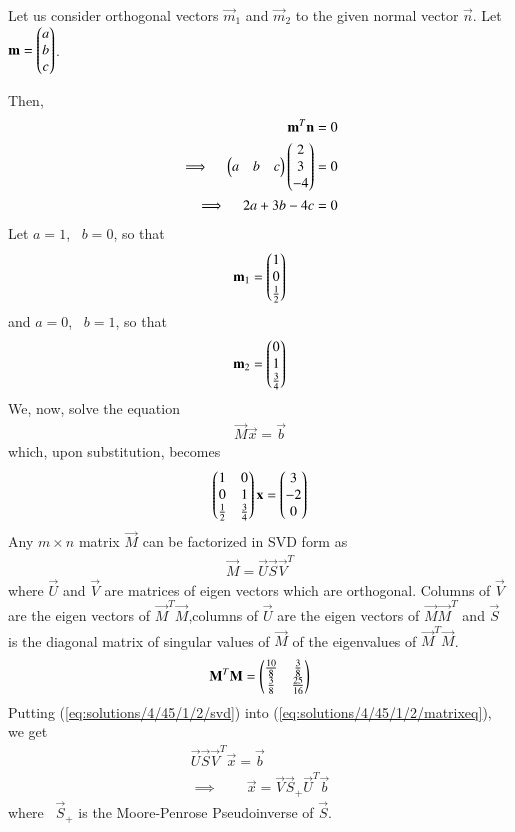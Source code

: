 Let us consider orthogonal vectors $\vec{m}_1$ and $\vec{m}_2$ to the given
normal vector $\vec{n}$. Let $\mathbf{m} = \begin{pmatrix}a\\ b\\ c\end{pmatrix}$.

Then, 
\begin{align}
	\mathbf{m}^T\mathbf{n} = 0 \\
	\implies \quad \begin{pmatrix}a & b & c\end{pmatrix}\begin{pmatrix}2\\ 3\\-4\end{pmatrix} = 0   \label{eq:solutions/4/45/1/2/mTn} \\
	\implies \quad 2a + 3b -4c = 0 
\end{align}
Let $a=1$, \ $b=0$, so that
\begin{align}
	\mathbf{m}_1 = \begin{pmatrix}1 \\ 0 \\ \frac{1}{2}\end{pmatrix} 
\end{align}
and $a=0$, \ $b=1$, so that
\begin{align}
	\mathbf{m}_2 = \begin{pmatrix}0 \\ 1 \\ \frac{3}{4}\end{pmatrix} 
\end{align}
We, now, solve the equation
\begin{align}
	\vec{M}\vec{x} = \vec{b} 	\label{eq:solutions/4/45/1/2/matrixeq}
\end{align}
which, upon substitution, becomes
\begin{align}
\begin{pmatrix}1 & 0\\ 0 & 1 \\ \frac{1}{2} & \frac{3}{4}\end{pmatrix}\mathbf{x}=\begin{pmatrix}3 \\ -2 \\ 0\end{pmatrix} 
\end{align}
	Any $m\times n$ matrix $\vec{M}$ can be factorized in SVD form as
\begin{align}
	\vec{M} = \vec{U}\vec{S}\vec{V}^T	\label{eq:solutions/4/45/1/2/svd}
\end{align}
where $\vec{U}$ and $\vec{V}$ are matrices of eigen vectors which are orthogonal. Columns of $\vec{V}$ are the eigen vectors of $\vec{M}^T\vec{M}$,columns of $\vec{U}$ are the eigen vectors of $\vec{M}\vec{M}^T$ and $\vec{S}$ is the diagonal matrix of singular values of $\vec{M}$ of the eigenvalues of $\vec{M}^T\vec{M}$.
\begin{align}
	\mathbf{M}^T\mathbf{M} = 
	\begin{pmatrix}\frac{10}{8} & \frac{3}{8} \\ \frac{3}{8} & \frac{25}{16} \end{pmatrix}
\end{align}
Putting (\ref{eq:solutions/4/45/1/2/svd}) into (\ref{eq:solutions/4/45/1/2/matrixeq}), we get
\begin{align}
	\vec{U}\vec{S} \vec{V}^T\vec{x} = \vec{b} \\
    \implies \qquad \vec{x} = \vec{V}\vec{S}_{+}\vec{U}^T\vec{b} \label{eq:solutions/4/45/1/2/calcx}
\end{align}
where \ $\vec{S}_{+}$ is the Moore-Penrose Pseudoinverse of $\vec{S}$.

